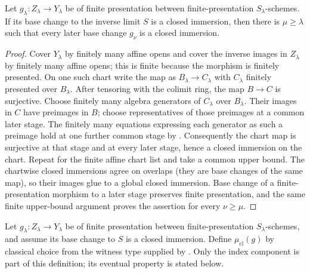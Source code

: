 \begin{lemma}
  \label{lemma:nagata-closed-immersion-stage-exists}
  \leanok

  Let $g_\lambda\colon Z_\lambda\to Y_\lambda$ be of finite presentation
  between finite-presentation $S_\lambda$-schemes.  If its base change to the
  inverse limit $S$ is a closed immersion, then there is
  $\mu\geq\lambda$ such that every later base change $g_\nu$ is a closed
  immersion.
\end{lemma}

\begin{proof}
  \leanok
  Cover $Y_\lambda$ by finitely many affine opens and cover the inverse images
  in $Z_\lambda$ by finitely many affine opens; this is finite because the
  morphism is finitely presented.  On one such chart write the map as
  $B_\lambda\to C_\lambda$ with $C_\lambda$ finitely presented over
  $B_\lambda$.  After tensoring with the colimit ring, the map
  $B\to C$ is surjective.  Choose finitely many algebra generators of
  $C_\lambda$ over $B_\lambda$.  Their images in $C$ have preimages in $B$;
  choose representatives of those preimages at a common later stage.  The
  finitely many equations expressing each generator as such a preimage hold
  at one further common stage by
  .  Consequently the chart
  map is surjective at that stage and at every later stage, hence a closed
  immersion on the chart.  Repeat for the finite affine chart list and take a
  common upper bound.  The chartwise closed immersions agree on overlaps (they
  are base changes of the same map), so their images glue to a global closed
  immersion.  Base change of a finite-presentation morphism to a later stage
  preserves finite presentation, and the same finite upper-bound argument
  proves the assertion for every $\nu\geq\mu$.
\end{proof}

\begin{definition}
  \label{def:nagata-closed-immersion-stage}

  Let $g_\lambda\colon Z_\lambda\to Y_\lambda$ be of finite presentation
  between finite-presentation $S_\lambda$-schemes, and assume its base change
  to $S$ is a closed immersion.  Define $\mu_{\mathrm{cl}}(g)$ by classical
  choice from the witness type supplied by
  .  Only the index component
  is part of this definition; its eventual property is stated below.
\end{definition}

